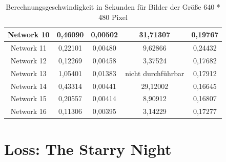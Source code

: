 \begin{table}[H]
\begin{tabular}{ |c|c|c|c|c| }
        Network 10 & 0,46090                                & 0,00502                                & 31,71307                               & 0,19767                                \\ \hline
        Network 11 & 0,22101                                & 0,00480                                & 9,62866                                & 0,24432                                \\ \hline
        Network 12 & 0,12269                                & 0,00458                                & 3,37524                                & 0,17682                                \\ \hline
        Network 13 & 1,05401                                & 0,01383                                & \textcolor{danger}{nicht durchführbar} & 0,17912                                \\ \hline
        Network 14 & 0,43314                                & 0,00441                                & 29,12002                               & 0,16645                                \\ \hline
        Network 15 & 0,20557                                & 0,00414                                & 8,90912                                & 0,16807                                \\ \hline
        Network 16 & 0,11306                                & 0,00395                                & 3,14229                                & 0,17277                                \\ \hline
    \end{tabular}
    \caption{Berechnungsgeschwindigkeit in Sekunden für Bilder der Größe 640 * 480 Pixel}
    \label{tab:640x480}
\end{table}

\pagebreak

\section{Loss: The Starry Night}

